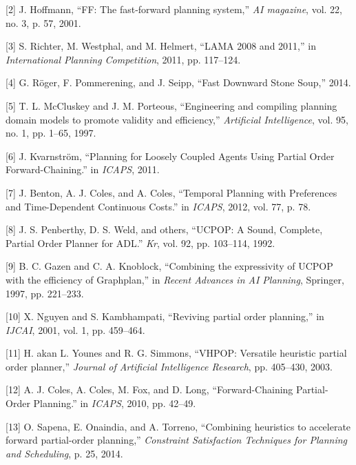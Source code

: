 \hypertarget{ref-hoffmannux5fffux5f2001}{}
{[}2{]} J. Hoffmann, ``FF: The fast-forward planning system,'' \emph{AI
magazine}, vol. 22, no. 3, p. 57, 2001.

\hypertarget{ref-richterux5flamaux5f2011}{}
{[}3{]} S. Richter, M. Westphal, and M. Helmert, ``LAMA 2008 and 2011,''
in \emph{International Planning Competition}, 2011, pp. 117--124.

\hypertarget{ref-rogerux5ffastux5f2014}{}
{[}4{]} G. Röger, F. Pommerening, and J. Seipp, ``Fast Downward Stone
Soup,'' 2014.

\hypertarget{ref-mccluskeyux5fengineeringux5f1997}{}
{[}5{]} T. L. McCluskey and J. M. Porteous, ``Engineering and compiling
planning domain models to promote validity and efficiency,''
\emph{Artificial Intelligence}, vol. 95, no. 1, pp. 1--65, 1997.

\hypertarget{ref-kvarnstromux5fplanningux5f2011}{}
{[}6{]} J. Kvarnström, ``Planning for Loosely Coupled Agents Using
Partial Order Forward-Chaining.'' in \emph{ICAPS}, 2011.

\hypertarget{ref-bentonux5ftemporalux5f2012}{}
{[}7{]} J. Benton, A. J. Coles, and A. Coles, ``Temporal Planning with
Preferences and Time-Dependent Continuous Costs.'' in \emph{ICAPS},
2012, vol. 77, p. 78.

\hypertarget{ref-penberthyux5fucpopux5f1992}{}
{[}8{]} J. S. Penberthy, D. S. Weld, and others, ``UCPOP: A Sound,
Complete, Partial Order Planner for ADL.'' \emph{Kr}, vol. 92, pp.
103--114, 1992.

\hypertarget{ref-gazenux5fcombiningux5f1997}{}
{[}9{]} B. C. Gazen and C. A. Knoblock, ``Combining the expressivity of
UCPOP with the efficiency of Graphplan,'' in \emph{Recent Advances in AI
Planning}, Springer, 1997, pp. 221--233.

\hypertarget{ref-nguyenux5frevivingux5f2001}{}
{[}10{]} X. Nguyen and S. Kambhampati, ``Reviving partial order
planning,'' in \emph{IJCAI}, 2001, vol. 1, pp. 459--464.

\hypertarget{ref-younesux5fvhpopux5f2003}{}
{[}11{]} H. akan L. Younes and R. G. Simmons, ``VHPOP: Versatile
heuristic partial order planner,'' \emph{Journal of Artificial
Intelligence Research}, pp. 405--430, 2003.

\hypertarget{ref-colesux5fforwardchainingux5f2010}{}
{[}12{]} A. J. Coles, A. Coles, M. Fox, and D. Long, ``Forward-Chaining
Partial-Order Planning.'' in \emph{ICAPS}, 2010, pp. 42--49.

\hypertarget{ref-sapenaux5fcombiningux5f2014}{}
{[}13{]} O. Sapena, E. Onaindia, and A. Torreno, ``Combining heuristics
to accelerate forward partial-order planning,'' \emph{Constraint
Satisfaction Techniques for Planning and Scheduling}, p. 25, 2014.

